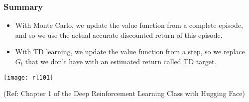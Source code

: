 



\begin{frame}[fragile]\frametitle{Summary}


\begin{itemize}
\item With Monte Carlo, we update the value function from a complete episode, and so we use the actual accurate discounted return of this episode.
\item With TD learning, we update the value function from a step, so we replace $G_t$ that we don't have with an estimated return called TD target.
\end{itemize}


\begin{center}
\texttt{[image: rl101]}
\end{center}



{\tiny (Ref: Chapter 1 of the Deep Reinforcement Learning Class with Hugging Face)}

\end{frame}
